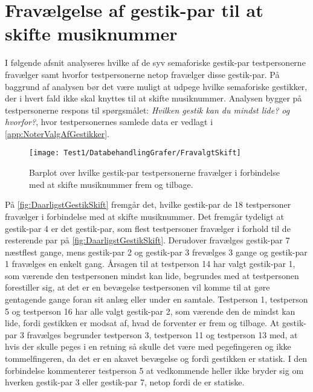 \section{Fravælgelse af gestik-par til at skifte musiknummer}
\label{app:TestresultaterSkiftDaarlig}
%
I følgende afsnit analyseres hvilke af de syv semaforiske gestik-par testpersonerne fravælger samt hvorfor testpersonerne netop fravælger disse gestik-par. På baggrund af analysen bør det være muligt at udpege hvilke semaforiske gestikker, der i hvert fald ikke skal knyttes til at skifte musiknummer. Analysen bygger på testpersonerne respons til spørgsmålet: \textit{Hvilken gestik kan du mindst lide? og hvorfor?}, hvor testpersonernes samlede data er vedlagt i \autoref{app:NoterValgAfGestikker}.
%
\begin{figure}[H]
	\centering
	\texttt{[image: Test1/DatabehandlingGrafer/FravalgtSkift]}
	\caption{Barplot over hvilke gestik-par testpersonerne fravælger i forbindelse med at skifte musiknummer frem og tilbage.}
	\label{fig:DaarligstGestikSkift}
\end{figure}
\noindent
%
På \autoref{fig:DaarligstGestikSkift} fremgår det, hvilke gestik-par de 18 testpersoner fravælger i forbindelse med at skifte musiknummer. Det fremgår tydeligt at gestik-par 4 er det gestik-par, som flest testpersoner fravælger i forhold til de resterende par på \autoref{fig:DaarligstGestikSkift}. Derudover fravælges gestik-par 7 næstflest gange, mens gestik-par 2 og gestik-par 3 frevælges 3 gange og gestik-par 1 fravælges en enkelt gang. Årsagen til at testperson 14 har valgt gestik-par 1, som værende den testpersonen mindst kan lide, begrundes med at testpersonen forestiller sig, at det er en bevægelse testpersonen vil komme til at gøre gentagende gange foran sit anlæg eller under en samtale. Testperson 1, testperson 5 og testperson 16 har alle valgt gestik-par 2, som værende den de mindst kan lide, fordi gestikken er modsat af, hvad de forventer er frem og tilbage. At gestik-par 3 fravælges begrunder testperson 3, testperson 11 og testperson 13 med, at hvis der skulle peges i en retning så skulle det være med pegefingeren og ikke tommelfingeren, da det er en akavet bevægelse og fordi gestikken er statisk. I den forbindelse kommenterer testperson 5 at vedkommende heller ikke bryder sig om hverken gestik-par 3 eller gestik-par 7, netop fordi de er statiske.

